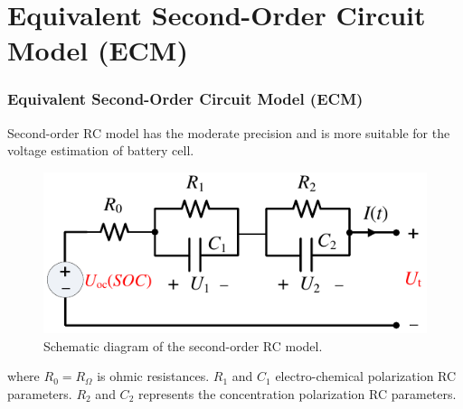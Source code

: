 \documentclass{beamer}
\begin{document}
\section{Equivalent Second-Order Circuit Model (ECM)}

\begin{frame}
	\begin{block}
		
	\frametitle{Equivalent Second-Order Circuit Model (ECM)}
		
		Second-order RC model has the moderate precision and is more
		suitable for the voltage estimation of battery cell.
		
		\begin{figure}
			\includegraphics[scale=0.90]{images/Schematic_diagram_of_the_second_order_RC_model.pdf}
			\vspace{-2mm}
			\caption{Schematic diagram of the second-order RC model.}
		\end{figure}
		
	\end{block}	
	
	where $R_{0}=R_{\Omega}$ is ohmic resistances. $R_{1}$ and $C_{1}$ electro-chemical polarization RC parameters. $R_{2}$ and $C_{2}$ represents the concentration polarization RC parameters.
	
\end{frame}
\end{document}
